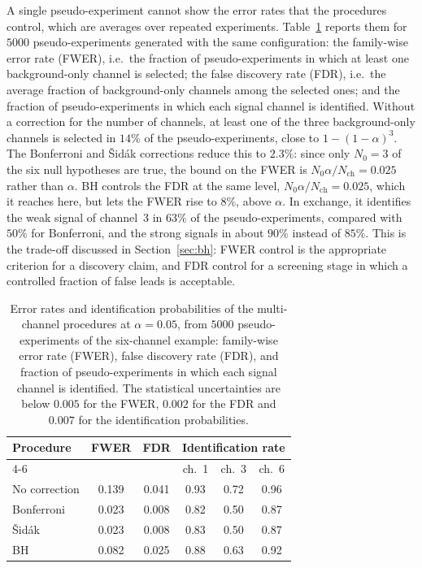 A single pseudo-experiment cannot show the error rates that the procedures control, which are averages over repeated experiments. Table~\ref{tab:channel_rates} reports them for $5000$ pseudo-experiments generated with the same configuration: the family-wise error rate (FWER), i.e.\ the fraction of pseudo-experiments in which at least one background-only channel is selected; the false discovery rate (FDR), i.e.\ the average fraction of background-only channels among the selected ones; and the fraction of pseudo-experiments in which each signal channel is identified. Without a correction for the number of channels, at least one of the three background-only channels is selected in $14\%$ of the pseudo-experiments, close to $1-(1-\alpha)^3$. The Bonferroni and \v{S}id\'ak corrections reduce this to $2.3\%$: since only $N_0=3$ of the six null hypotheses are true, the bound on the FWER is $N_0\alpha/N_\text{ch}=0.025$ rather than $\alpha$. BH controls the FDR at the same level, $N_0\alpha/N_\text{ch}=0.025$, which it reaches here, but lets the FWER rise to $8\%$, above $\alpha$. In exchange, it identifies the weak signal of channel~3 in $63\%$ of the pseudo-experiments, compared with $50\%$ for Bonferroni, and the strong signals in about $90\%$ instead of $85\%$. This is the trade-off discussed in Section~\ref{sec:bh}: FWER control is the appropriate criterion for a discovery claim, and FDR control for a screening stage in which a controlled fraction of false leads is acceptable.
\begin{table}[htbp]
  \centering
  \caption{Error rates and identification probabilities of the multi-channel procedures at $\alpha=0.05$, from $5000$ pseudo-experiments of the six-channel example: family-wise error rate (FWER), false discovery rate (FDR), and fraction of pseudo-experiments in which each signal channel is identified. The statistical uncertainties are below $0.005$ for the FWER, $0.002$ for the FDR and $0.007$ for the identification probabilities.}
  \label{tab:channel_rates}
  \begin{tabular}{lccccc}
    \toprule
    Procedure & FWER & FDR & \multicolumn{3}{c}{Identification rate} \\
    \cmidrule(lr){4-6}
     & & & ch.~1 & ch.~3 & ch.~6 \\
    \midrule
    No correction & 0.139 & 0.041 & 0.93 & 0.72 & 0.96 \\
    Bonferroni & 0.023 & 0.008 & 0.82 & 0.50 & 0.87 \\
    \v{S}id\'ak & 0.023 & 0.008 & 0.83 & 0.50 & 0.87 \\
    BH & 0.082 & 0.025 & 0.88 & 0.63 & 0.92 \\
    \bottomrule
  \end{tabular}
\end{table}

